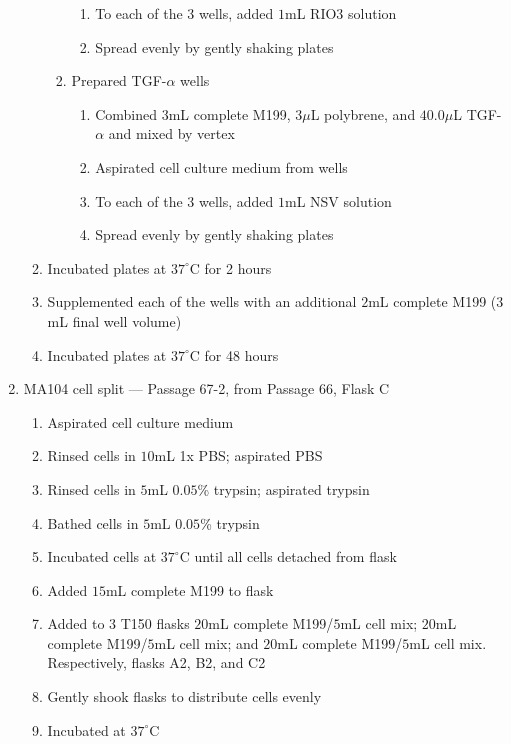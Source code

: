 \begin{enumerate}
\begin{enumerate}
\begin{enumerate}
\begin{enumerate}
							\item To each of the 3 wells, added $1$mL RIO3 solution
							\item Spread evenly by gently shaking plates
						\end{enumerate}
					\item Prepared TGF-$\alpha$ wells
						\begin{enumerate}
							\item Combined $3$mL complete M199, $3\mu$L polybrene, and $40.0\mu$L TGF-$\alpha$ and mixed by vertex
							\item Aspirated cell culture medium from wells
							\item To each of the 3 wells, added $1$mL NSV solution
							\item Spread evenly by gently shaking plates
						\end{enumerate}
				\end{enumerate}
			\item Incubated plates at $37^{\circ}$C for 2 hours
			\item Supplemented each of the wells with an additional $2$mL complete M199 ($3$mL final well volume)
			\item Incubated plates at $37^{\circ}$C for 48 hours
		\end{enumerate}
	\item MA104 cell split --- Passage 67-2, from Passage 66, Flask C
		\begin{enumerate}
			\item Aspirated cell culture medium
			\item Rinsed cells in $10$mL 1x PBS; aspirated PBS
			\item Rinsed cells in $5$mL $0.05$\% trypsin; aspirated trypsin
			\item Bathed cells in $5$mL $0.05$\% trypsin
			\item Incubated cells at $37^{\circ}$C until all cells detached from flask
			\item Added $15$mL complete M199 to flask
			\item Added to $3$ T150 flasks $20$mL complete M199/$5$mL cell mix; $20$mL complete M199/$5$mL cell mix; and $20$mL complete M199/$5$mL cell mix. Respectively, flasks A2, B2, and C2
			\item Gently shook flasks to distribute cells evenly
			\item Incubated at $37^{\circ}$C
		\end{enumerate}
\end{enumerate}

